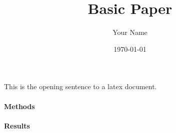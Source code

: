 \documentclass{article}  %
\title{Basic Paper}
\author{Your Name}
\date{\today}
\begin{document}
\maketitle
\newpage
\thispagestyle{fancy}
\section*{}
\paragraph{}
This is the opening sentence to a latex document.
\lipsum[1]
\paragraph{}
\lipsum[2]
\paragraph*{Methods}
\lipsum[3]
\paragraph{}
\lipsum[4]
\paragraph{}
\lipsum[5]
\paragraph*{Results}
\end{document}
